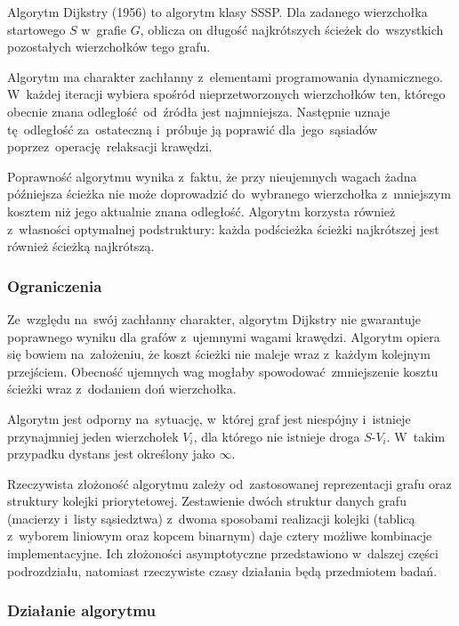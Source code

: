 \documentclass[11pt,a4paper,oneside]{report}
\begin{document}
Algorytm Dijkstry (1956) \cite{dijkstra-1959-shortestpath} to algorytm klasy SSSP. Dla zadanego wierzchołka startowego $S$ w~grafie $G$, oblicza on długość najkrótszych ścieżek do~wszystkich pozostałych wierzchołków tego grafu.

Algorytm ma charakter zachłanny z~elementami programowania dynamicznego. W~każdej iteracji wybiera spośród nieprzetworzonych wierzchołków ten, którego obecnie znana odległość od~źródła jest najmniejsza. Następnie uznaje tę~odległość za~ostateczną i~próbuje ją poprawić dla~jego~sąsiadów poprzez~operację relaksacji krawędzi.

Poprawność algorytmu wynika z~faktu, że przy nieujemnych wagach żadna późniejsza ścieżka nie może doprowadzić do~wybranego wierzchołka z~mniejszym kosztem niż jego aktualnie znana odległość. Algorytm korzysta również z~własności optymalnej podstruktury: każda podścieżka ścieżki najkrótszej jest również ścieżką najkrótszą.

\subsubsection{Ograniczenia}

Ze~względu na~swój zachłanny charakter, algorytm Dijkstry nie gwarantuje poprawnego wyniku dla grafów z~ujemnymi wagami krawędzi. Algorytm opiera się bowiem na~założeniu, że koszt ścieżki nie maleje wraz z~każdym kolejnym przejściem. Obecność ujemnych wag mogłaby spowodować zmniejszenie kosztu ścieżki wraz z~dodaniem doń wierzchołka.

Algorytm jest odporny na~sytuację, w~której graf jest niespójny i~istnieje przynajmniej jeden wierzchołek $V_i$, dla którego nie istnieje droga $S$-$V_i$. W~takim przypadku dystans jest określony jako $\infty$.

Rzeczywista złożoność algorytmu zależy od~zastosowanej reprezentacji grafu oraz struktury kolejki priorytetowej. Zestawienie dwóch struktur danych grafu (macierzy i~listy sąsiedztwa) z~dwoma sposobami realizacji kolejki (tablicą z~wyborem liniowym oraz kopcem binarnym) daje cztery możliwe kombinacje implementacyjne. Ich złożoności asymptotyczne przedstawiono w~dalszej części podrozdziału, natomiast rzeczywiste czasy działania będą przedmiotem badań.

\subsubsection{Działanie algorytmu}
\end{document}
